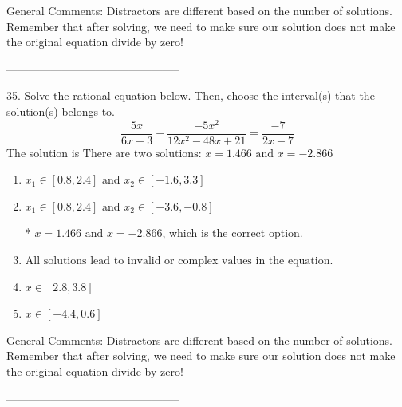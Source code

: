 \documentclass{extbook}[14pt]
\begin{document}
General Comments: Distractors are different based on the number of solutions. Remember that after solving, we need to make sure our solution does not make the original equation divide by zero!

-----------------------------------------------

35. Solve the rational equation below. Then, choose the interval(s) that the solution(s) belongs to.
\[ \frac{5x}{6x -3} + \frac{-5x^{2}}{12x^{2} -48 x + 21} = \frac{-7}{2x -7} \] 
The solution is $ \text{There are two solutions: } x = 1.466 \text{ and } x = -2.866 $ 

\begin{enumerate}[label=\Alph*.] 
\item $ x_1 \in [0.8, 2.4] \text{ and } x_2 \in [-1.6,3.3] $ 

  
\item $ x_1 \in [0.8, 2.4] \text{ and } x_2 \in [-3.6,-0.8] $ 

 * $x = 1.466 \text{ and } x = -2.866$, which is the correct option. 
\item $ \text{All solutions lead to invalid or complex values in the equation.} $ 

  
\item $ x \in [2.8,3.8] $ 

  
\item $ x \in [-4.4,0.6] $ 

  
\end{enumerate} 
 
General Comments: Distractors are different based on the number of solutions. Remember that after solving, we need to make sure our solution does not make the original equation divide by zero!

-----------------------------------------------
\end{document}

